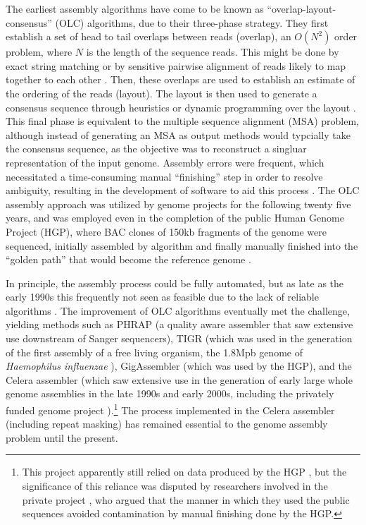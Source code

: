 The earliest assembly algorithms have come to be known as ``overlap-layout-consensus'' (OLC) algorithms, due to their three-phase strategy.
They first establish a set of head to tail overlaps between reads (overlap), an $O(N^{2})$ order problem, where $N$ is the length of the sequence reads.
This might be done by exact string matching or by sensitive pairwise alignment of reads likely to map together to each other \cite{huang1992contig}. 
Then, these overlaps are used to establish an estimate of the ordering of the reads (layout).
The layout is then used to generate a consensus sequence through heuristics or dynamic programming over the layout \cite{kececioglu1995combinatorial}.
This final phase is equivalent to the multiple sequence alignment (MSA) problem, although instead of generating an MSA as output methods would typcially take the consensus sequence, as the objective was to reconstruct a singluar representation of the input genome.
Assembly errors were frequent, which necessitated a time-consuming manual ``finishing'' step in order to resolve ambiguity, resulting in the development of software to aid this process \cite{gordon1998consed}.
The OLC assembly approach was utilized by genome projects for the following twenty five years, and was employed even in the completion of the public Human Genome Project (HGP), where BAC clones of 150kb fragments of the genome were sequenced, initially assembled by algorithm and finally manually finished into the ``golden path'' that would become the reference genome \cite{international2001initial}.

In principle, the assembly process could be fully automated, but as late as the early 1990s this frequently not seen as feasible due to the lack of reliable algorithms \cite{mahy1991sequencing}.
The improvement of OLC algorithms eventually met the challenge, yielding methods such as PHRAP \cite{green1999phrap} (a quality aware assembler that saw extensive use downstream of Sanger sequencers), TIGR \cite{sutton1995tigr} (which was used in the generation of the first assembly of a free living organism, the 1.8Mpb genome of \emph{Haemophilus influenzae} \cite{fleischmann1995whole}), GigAssembler \cite{kent2001assembly} (which was used by the HGP), and the Celera assembler \cite{myers2000whole,miller2008aggressive} (which saw extensive use in the generation of early large whole genome assemblies in the late 1990s and early 2000s, including the privately funded genome project \cite{venter2001sequence}).\footnote{This project apparently still relied on data produced by the HGP \cite{waterston2002sequencing}, but the significance of this reliance was disputed by researchers involved in the private project \cite{myers2002sequencing}, who argued that the manner in which they used the public sequences avoided contamination by manual finishing done by the HGP.}
The process implemented in the Celera assembler (including repeat masking) has remained essential to the genome assembly problem until the present.

